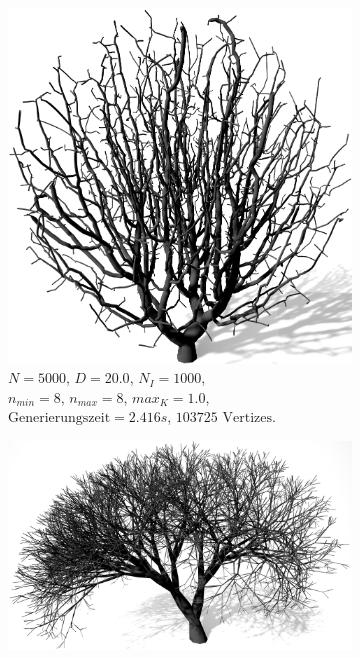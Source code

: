 \begin{figure} [hbtp]
	\centering
	\begin{subfigure}[t]{.45\textwidth}
		\centering
		\includegraphics[height=.19\textheight]{images/Performance_SCA_Quali_Segments_High.png}
		\caption{$N = 5000$, $D = 20.0$, $N_I = 1000$,\\ $n_{min} = 8$, $n_{max} = 8$, $max_K = 1.0$,\\  $\text{Generierungszeit} = 2.416s$, $103725 \text{ Vertizes}$.}
		\label{subfig:Performance_SCA_Quali_Segments_High}
	\end{subfigure}
	\begin{subfigure}[t]{.5\textwidth}
		\centering
		\includegraphics[height=.19\textheight]{images/Performance_LS_Ternary_4_Tropism.png}

\end{subfigure}
\end{figure}
